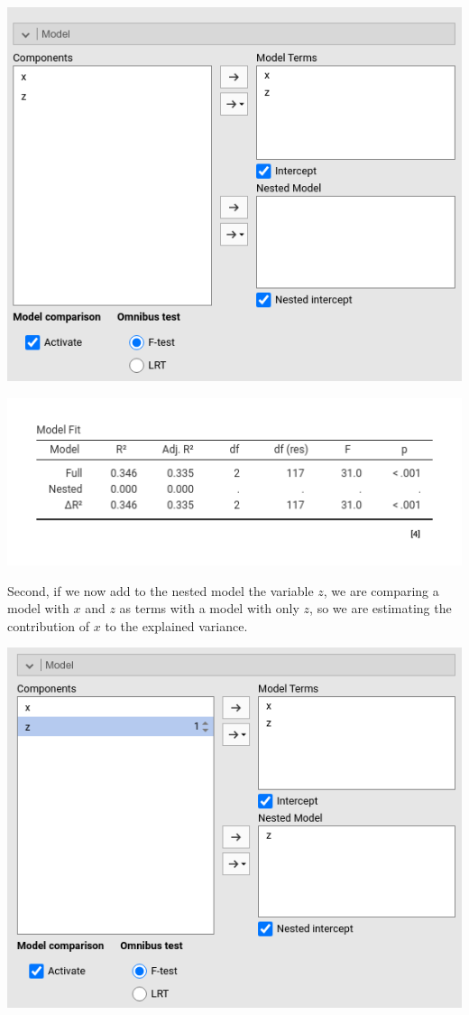 \documentclass[
]{book}
\begin{document}
\includegraphics[width=7.71in]{bookletpics/2_modelcomparison_input5}

\includegraphics[width=7.14in]{bookletpics/2_modelcomparison_output5}

Second, if we now add to the nested model the variable \(z\), we are comparing a model with \(x\) and \(z\) as terms with a model with only \(z\), so we are estimating the contribution of \(x\) to the explained variance.

\includegraphics[width=7.78in]{bookletpics/2_modelcomparison_input6}
\end{document}
